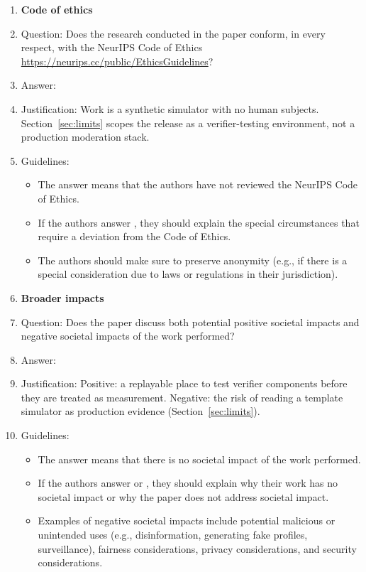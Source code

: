 \begin{enumerate}
\item {\bf Code of ethics}
    \item[] Question: Does the research conducted in the paper conform, in every respect, with the NeurIPS Code of Ethics \url{https://neurips.cc/public/EthicsGuidelines}?
    \item[] Answer: \answerYes{}
    \item[] Justification: Work is a synthetic simulator with no human subjects. Section~\ref{sec:limits} scopes the release as a verifier-testing environment, not a production moderation stack.
    \item[] Guidelines:
    \begin{itemize}
        \item The answer \answerNA{} means that the authors have not reviewed the NeurIPS Code of Ethics.
        \item If the authors answer \answerNo{}, they should explain the special circumstances that require a deviation from the Code of Ethics.
        \item The authors should make sure to preserve anonymity (e.g., if there is a special consideration due to laws or regulations in their jurisdiction).
    \end{itemize}

\item {\bf Broader impacts}
    \item[] Question: Does the paper discuss both potential positive societal impacts and negative societal impacts of the work performed?
    \item[] Answer: \answerYes{}
    \item[] Justification: Positive: a replayable place to test verifier components before they are treated as measurement. Negative: the risk of reading a template simulator as production evidence (Section~\ref{sec:limits}).
    \item[] Guidelines:
    \begin{itemize}
        \item The answer \answerNA{} means that there is no societal impact of the work performed.
        \item If the authors answer \answerNA{} or \answerNo{}, they should explain why their work has no societal impact or why the paper does not address societal impact.
        \item Examples of negative societal impacts include potential malicious or unintended uses (e.g., disinformation, generating fake profiles, surveillance), fairness considerations, privacy considerations, and security considerations.
    \end{itemize}


\end{enumerate}
